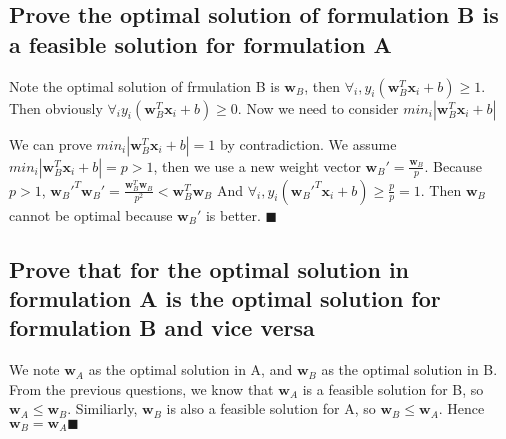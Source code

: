 \documentclass{article}
\begin{document}
	\subsection{Prove the optimal solution of formulation B is a feasible solution for formulation A}
	Note the optimal solution of frmulation B is $\textbf{w}_B$, then $\forall_i,y_i(\textbf{w}_B^T\textbf{x}_i+b)\geq1$. Then obviously $\forall_iy_i(\textbf{w}_B^T\textbf{x}_i+b)\geq0$. Now we need to consider $min_i|\textbf{w}_B^T\textbf{x}_i+b|$\par
	We can prove $min_i|\textbf{w}_B^T\textbf{x}_i+b|=1$ by contradiction. We assume $min_i|\textbf{w}_B^T\textbf{x}_i+b|=p>1$, then we use a new weight vector $\textbf{w}_B'=\frac{\textbf{w}_B}{p}$. Because $p>1$, $\textbf{w}_B'^T\textbf{w}_B'=\frac{\textbf{w}_B^T\textbf{w}_B}{p^2}<\textbf{w}_B^T\textbf{w}_B$ And $\forall_i,y_i(\textbf{w}_B'^T\textbf{x}_i+b)\geq\frac p p=1$. Then $\textbf{w}_B$ cannot be optimal because $\textbf{w}_B'$ is better. $\blacksquare$
	
	\subsection{Prove that for the optimal solution in formulation A is the optimal solution for formulation B and vice versa}
	We note $\textbf{w}_A$ as the optimal solution in A, and $\textbf{w}_B$ as the optimal solution in B. From the previous questions, we know that $\textbf{w}_A$ is a feasible solution for B, so $\textbf{w}_A\leq\textbf{w}_B$. Similiarly, $\textbf{w}_B$ is also a feasible solution for A, so $\textbf{w}_B\leq\textbf{w}_A$. Hence $\textbf{w}_B=\textbf{w}_A\blacksquare$
\end{document}
